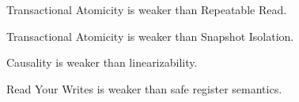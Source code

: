 \begin{observation}
Transactional Atomicity is weaker than Repeatable Read.
\end{observation}

\begin{observation}
Transactional Atomicity is weaker than Snapshot Isolation.
\end{observation}

\begin{observation}
Causality is weaker than linearizability.
\end{observation}

\begin{observation}
Read Your Writes is weaker than safe register semantics.
\end{observation}

